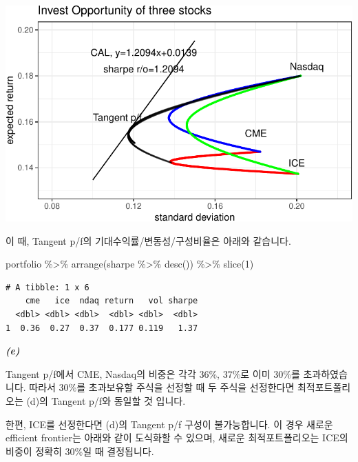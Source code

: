 \documentclass[
  letterpaper,
  DIV=11,
  numbers=noendperiod]{scrreprt}
\newenvironment{Shaded}{\begin{snugshade}}{\end{snugshade}}
\newcommand{\DecValTok}[1]{\textcolor[rgb]{0.68,0.00,0.00}{#1}}
\newcommand{\FunctionTok}[1]{\textcolor[rgb]{0.28,0.35,0.67}{#1}}
\newcommand{\NormalTok}[1]{\textcolor[rgb]{0.00,0.23,0.31}{#1}}
\newcommand{\SpecialCharTok}[1]{\textcolor[rgb]{0.37,0.37,0.37}{#1}}
\begin{document}
\includegraphics{investment_hw2_files/figure-pdf/unnamed-chunk-7-1.pdf}

이 때, Tangent p/f의 기대수익률/변동성/구성비율은 아래와 같습니다.

\begin{Shaded}
\begin{Highlighting}[]
\NormalTok{portfolio }\SpecialCharTok{\%\textgreater{}\%} \FunctionTok{arrange}\NormalTok{(sharpe }\SpecialCharTok{\%\textgreater{}\%} \FunctionTok{desc}\NormalTok{()) }\SpecialCharTok{\%\textgreater{}\%} \FunctionTok{slice}\NormalTok{(}\DecValTok{1}\NormalTok{)}
\end{Highlighting}
\end{Shaded}

\begin{verbatim}
# A tibble: 1 x 6
    cme   ice  ndaq return   vol sharpe
  <dbl> <dbl> <dbl>  <dbl> <dbl>  <dbl>
1  0.36  0.27  0.37  0.177 0.119   1.37
\end{verbatim}

\textbf{\emph{(e)}}

Tangent p/f에서 CME, Nasdaq의 비중은 각각 36\%, 37\%로 이미 30\%를
초과하였습니다. 따라서 30\%를 초과보유할 주식을 선정할 때 두 주식을
선정한다면 최적포트폴리오는 (d)의 Tangent p/f와 동일할 것 입니다.

한편, ICE를 선정한다면 (d)의 Tangent p/f 구성이 불가능합니다. 이 경우
새로운 efficient frontier는 아래와 같이 도식화할 수 있으며, 새로운
최적포트폴리오는 ICE의 비중이 정확히 30\%일 때 결정됩니다.
\end{document}
